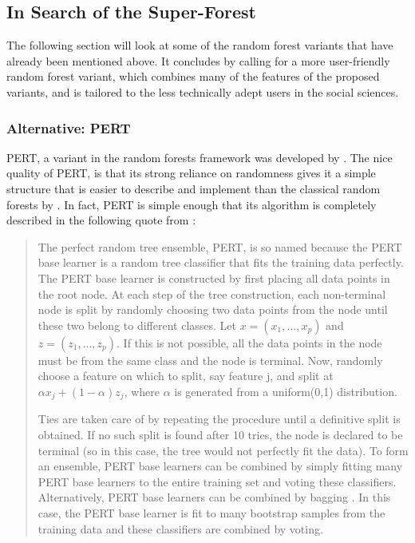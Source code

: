 \documentclass[a4paper,man,12pt,apacite,floatsintext,draftfirst]{apa6} %
\begin{document}
\subsection{In Search of the Super-Forest}
The following section will look at some of the random forest variants that
have already been mentioned above. It concludes by calling for a more
user-friendly random forest variant, which combines many of the features of
the proposed variants, and is tailored to the less technically adept users
in the social sciences.

\subsubsection{Alternative: PERT}
PERT, a variant in the random forests framework was developed
by \cite{cutler2001pert}.
The nice quality of PERT, is that its strong reliance on randomness gives
it a simple structure that is easier to describe and implement than the
classical random forests by \cite{breiman2001random}.
In fact, PERT is simple enough that its algorithm is completely described
in the following quote from \cite{cutler2001pert}:

\begin{quotation}
The perfect random tree ensemble, PERT, is so named because the PERT base
learner is a random tree classifier that fits the training data perfectly.
The PERT base learner is constructed by first placing all data points in
the root node.
At each step of the tree construction, each non-terminal node is split by
randomly choosing two data points from the node until these two belong to
different classes.
Let \( x = (x_{1} , . . . , x_{p} ) \) and \( z = (z_{1} , . . . , z_{p} ) \).
If this is not possible, all the data points in the node must be from the
same class and the node is terminal.
Now, randomly choose a feature on which to split, say feature j, and split
at \( \alpha x_{j} + (1 - \alpha) z_{j} \), where \( \alpha \) is generated
from a uniform(0,1) distribution.

Ties are taken care of by repeating the procedure until a definitive
split is obtained.
If no such split is found after 10 tries, the node is declared to be
terminal (so in this case, the tree would not perfectly fit the data).
To form an ensemble, PERT base learners can be combined by simply fitting
many PERT base learners to the entire training set and voting these
classifiers.
Alternatively, PERT base learners can be combined by bagging
\cite{breiman1996bagging}.
In this case, the PERT base learner is fit to many bootstrap samples
from the training data and these classifiers are combined by voting.
\end{quotation}
\end{document}
